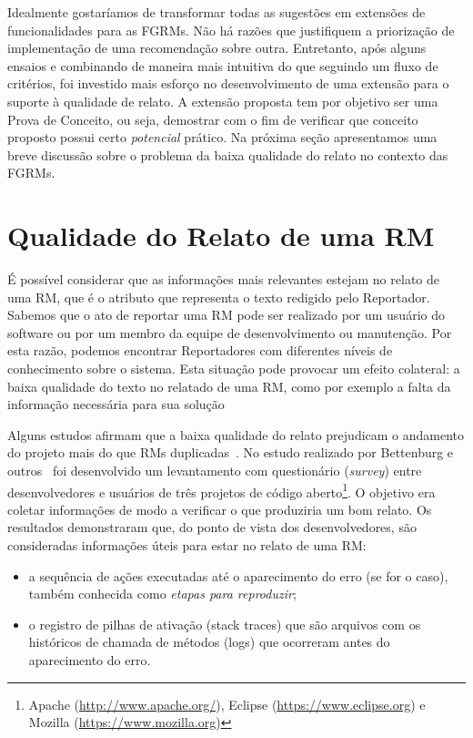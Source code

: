 Idealmente gostaríamos de transformar todas as sugestões em extensões de
funcionalidades para as FGRMs. Não há razões que justifiquem a priorização de
implementação de uma recomendação sobre outra. Entretanto, após alguns ensaios e
combinando de maneira mais intuitiva do que seguindo um fluxo de critérios,  foi
investido mais esforço no desenvolvimento de uma extensão para o suporte à
qualidade de relato. A extensão proposta tem por objetivo ser uma Prova de
Conceito, ou seja, demostrar com o fim de verificar que conceito proposto possui
certo \textit{potencial} prático. Na próxima seção apresentamos uma breve
discussão sobre o problema da baixa qualidade do relato no contexto das FGRMs.

\section{Qualidade do Relato de uma RM}
\label{sec:avaliando_a_qualidade_do_relato_de_uma_rm}

É possível considerar que as informações mais relevantes estejam no relato de
uma RM, que é o atributo que representa o texto redigido pelo Reportador.
Sabemos que o ato de reportar uma RM pode ser realizado por um usuário do
software ou por um membro da equipe de desenvolvimento ou manutenção. Por esta
razão, podemos encontrar Reportadores com diferentes níveis de conhecimento
sobre o sistema. Esta situação pode provocar um efeito colateral: a baixa
qualidade do texto no relatado de uma RM, como por exemplo a falta da informação
necessária para sua solução

Alguns estudos afirmam que a baixa qualidade do relato prejudicam o andamento do
projeto mais do que RMs duplicadas~\cite{bettenburg2007quality}. No estudo
realizado por Bettenburg e outros~\cite{bettenburg2008makes} foi desenvolvido um
levantamento com questionário (\textit{survey}) entre desenvolvedores e usuários
de três projetos de código aberto\footnote{Apache
    (\url{http://www.apache.org/}), Eclipse (\url{https://www.eclipse.org}) e
    Mozilla (\url{https://www.mozilla.org})}. O objetivo era coletar informações
de modo a verificar o que produziria um bom relato. Os resultados demonstraram
que, do ponto de vista dos desenvolvedores, são consideradas informações úteis
para estar no relato de uma RM\@:

\begin{itemize}
    \item a sequência de ações executadas até o aparecimento do erro (se for o
        caso), também conhecida como \textit{etapas para reproduzir};
    \item o registro de pilhas de ativação (stack traces) que são arquivos com
        os históricos de chamada de métodos (logs) que ocorreram antes do
        aparecimento do erro.
\end{itemize}

